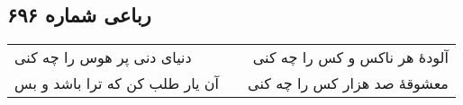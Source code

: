 \begin{center}
\section*{رباعی شماره ۶۹۶}
\label{sec:sh696}
\begin{longtable}{l p{0.5cm} r}
دنیای دنی پر هوس را چه کنی
&&
آلودهٔ هر ناکس و کس را چه کنی
\\
آن یار طلب کن که ترا باشد و بس
&&
معشوقهٔ صد هزار کس را چه کنی
\\
\end{longtable}
\end{center}
